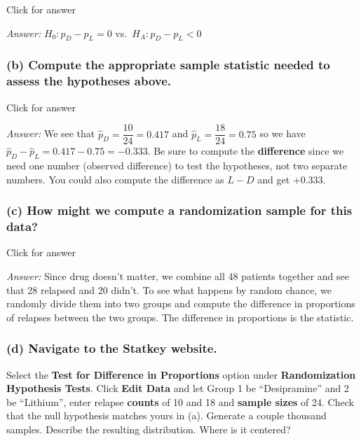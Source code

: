 \documentclass[
]{book}
\begin{document}
Click for answer

\emph{Answer:} \(H_0: p_D - p_L =0\) vs.~\(H_A: p_D - p_L < 0\)

\hypertarget{b-compute-the-appropriate-sample-statistic-needed-to-assess-the-hypotheses-above.}{%
\subsubsection{(b) Compute the appropriate sample statistic needed to assess the hypotheses above.}\label{b-compute-the-appropriate-sample-statistic-needed-to-assess-the-hypotheses-above.}}

Click for answer

\emph{Answer:} We see that \(\hat{p}_D = \dfrac{10}{24} = 0.417\) and \(\hat{p}_L = \dfrac{18}{24} = 0.75\) so we have \(\hat{p}_D -\hat{p}_L = 0.417 - 0.75 = -0.333\). Be sure to compute the \textbf{difference} since we need one number (observed difference) to test the hypotheses, not two separate numbers. You could also compute the difference as \(L-D\) and get +0.333.

\hypertarget{c-how-might-we-compute-a-randomization-sample-for-this-data}{%
\subsubsection{(c) How might we compute a randomization sample for this data?}\label{c-how-might-we-compute-a-randomization-sample-for-this-data}}

Click for answer

\emph{Answer:} Since drug doesn't matter, we combine all 48 patients together and see that 28 relapsed and 20 didn't. To see what happens by random chance, we randomly divide them into two groups and compute the difference in proportions of relapses between the two groups. The difference in proportions is the statistic.

\hypertarget{d-navigate-to-the-statkey-website.}{%
\subsubsection{(d) Navigate to the Statkey website.}\label{d-navigate-to-the-statkey-website.}}

Select the \textbf{Test for Difference in Proportions} option under \textbf{Randomization Hypothesis Tests}. Click \textbf{Edit Data} and let Group 1 be ``Desipramine'' and 2 be ``Lithium'', enter relapse \textbf{counts} of 10 and 18 and \textbf{sample sizes} of 24. Check that the null hypothesis matches yours in (a). Generate a couple thousand samples. Describe the resulting distribution. Where is it centered?
\end{document}
